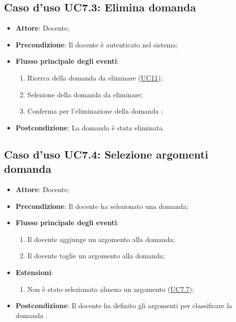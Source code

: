 \documentclass[12pt,a4paper]{article}
\begin{document}
\subsection{Caso d'uso UC7.3: Elimina domanda}

\begin{itemize}

\item \textbf{Attore}: Docente; 
\item \textbf{Precondizione}: Il docente è autenticato nel sistema;

\item \textbf{Flusso principale degli eventi}:
\begin{enumerate}
	\item Ricerca della domanda da eliminare (\hyperlink{UC11}{UC11});
	\item Selezione della domanda da eliminare;
	\item Conferma per l'eliminazione della domanda	;
	
\end{enumerate}
\item \textbf{Postcondizione}: La domanda è stata eliminata.
\end{itemize}
\hypertarget{UC7.4}{}
\subsection{Caso d'uso UC7.4: Selezione argomenti domanda}

\begin{itemize}

\item \textbf{Attore}: Docente; 
\item \textbf{Precondizione}: Il docente ha selezionato una domanda;

\item \textbf{Flusso principale degli eventi}:
\begin{enumerate}
	\item Il docente aggiunge un argomento alla domanda;
	\item Il docente toglie un argomento alla domanda;
	
\end{enumerate}
\item \textbf{Estensioni}:
\begin{enumerate}
	\item Non è stato selezionato almeno un argomento (\hyperlink{UC7.7}{UC7.7});
	
\end{enumerate}
\item \textbf{Postcondizione}: Il docente ha definito gli argomenti per classificare la domanda
.
\end{itemize}
\hypertarget{UC7.5}{}
\end{document}
